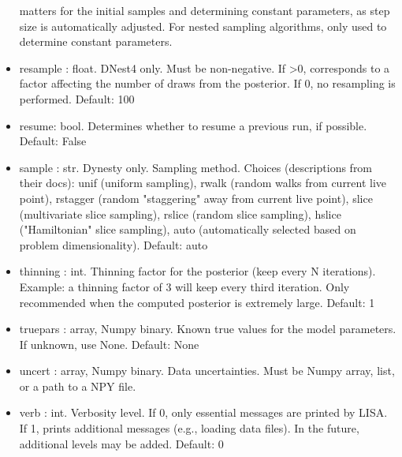 \documentclass[letterpaper, 12pt]{article}
\begin{document}
\begin{itemize}
                         matters for the initial samples and determining  
                         constant parameters, as step size is  
                         automatically adjusted.  For nested sampling  
                         algorithms, only used to determine constant  
                         parameters.
\item resample : float. DNest4 only. Must be non-negative.  
                         If >0, corresponds to a factor affecting the 
                         number of draws from the posterior.  If 0, no 
                         resampling is performed.  Default: 100
\item resume: bool.  Determines whether to resume a previous run, if possible. 
                     Default: False
\item sample : str. Dynesty only. Sampling method. Choices  
                        (descriptions from their docs): unif (uniform  
                        sampling), rwalk (random walks from current live  
                        point), rstagger (random "staggering" away from  
                        current live point), slice (multivariate slice  
                        sampling), rslice (random slice sampling), hslice  
                        ("Hamiltonian" slice sampling), auto  
                        (automatically selected based on problem  
                        dimensionality).  Default: auto
\item thinning : int. Thinning factor for the posterior  
                      (keep every N iterations).  
                      Example: a thinning factor of 3 will keep every  
                      third iteration.  Only recommended when the  
                      computed posterior is extremely large.   
                      Default: 1
\item truepars : array, Numpy binary. Known true values for the model  
                          parameters.  If unknown, use None.  Default: None
\item uncert : array, Numpy binary. Data uncertainties. 
                        Must be Numpy array, list, or a path to a NPY file.
\item verb : int. Verbosity level.  If 0, only essential messages 
                       are printed by LISA.  If 1, prints additional 
                       messages (e.g., loading data files).  
                       In the future, additional levels may be added.  
                       Default: 0
\end{itemize}
\end{document}
